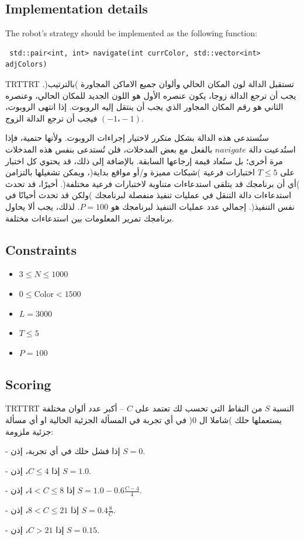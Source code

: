 \documentclass[12pt]{article}
\newenvironment{Arabic}     %
    {\textdir TRT\pardir TRT\arabicfont}{}
\begin{document}
\subsection{Implementation details}
The robot's strategy should be implemented as the following function:
\begin{lstlisting}
 std::pair<int, int> navigate(int currColor, std::vector<int> adjColors)
\end{lstlisting}

\begin{Arabic}
تستقبل الدالة لون المكان الحالي وألوان جميع الاماكن المجاورة )بالترتيب(. يجب أن ترجع الدالة زوجا، يكون عنصره الأول هو اللون الجديد للمكان الحالي، وعنصره الثاني هو رقم المكان المجاور الذي يجب أن ينتقل إليه الروبوت. إذا انتهى الروبوت، فيجب أن ترجع الدالة الزوج $(-1، -1)$.

ستُستدعى هذه الدالة بشكل متكرر لاختيار إجراءات الروبوت. ولأنها حتمية، فإذا استُدعيت دالة $navigate$ بالفعل مع بعض المدخلات، فلن تُستدعى بنفس هذه المدخلات مرة أخرى؛ بل ستُعاد قيمة إرجاعها السابقة. بالإضافة إلى ذلك، قد يحتوي كل اختبار على $T \leq 5$ اختبارات فرعية )شبكات مميزة و/أو مواقع بداية(، ويمكن تشغيلها بالتزامن )أي أن برنامجك قد يتلقى استدعاءات متناوبة لاختبارات فرعية مختلفة(. أخيرًا، قد تحدث استدعاءات دالة التنقل في عمليات تنفيذ منفصلة لبرنامجك )ولكن قد تحدث أحيانًا في نفس التنفيذ(. إجمالي عدد عمليات التنفيذ لبرنامجك هو $P = 100$. لذلك، يجب ألا يحاول برنامجك تمرير المعلومات بين استدعاءات مختلفة.
\end{Arabic}

\subsection{Constraints}

\begin{itemize}
\item $3 \leq N \leq 1000$
\item $0 \leq \mathrm{Color} < 1500$
\item $L = 3000$
\item $T \leq 5$
\item $P = 100$
\end{itemize}

\subsection{Scoring}

\begin{Arabic}
النسبة $S$ من النقاط التي تحسب لك تعتمد على $C$ -- أكبر عدد ألوان مختلفة يستعملها حلك )شاملا ال $0$( في أي تجربة في المسألة الجزئية الحالية او أي مسألة جزئية ملزومة:

- إذا فشل حلك في أي تجربة، إذن $S=0$.

- إذا $C ≤ 4$، إذن $S = 1.0$.

- إذا $4 < C ≤ 8$، إذن $S = 1.0 - 0.6 \frac{C - 4}{4}$.

- إذا $8 < C ≤ 21$، إذن $S = 0.4 \frac{8}{C}$.

- إذا $C > 21$، إذن $S = 0.15$.
\end{Arabic}
\end{document}
